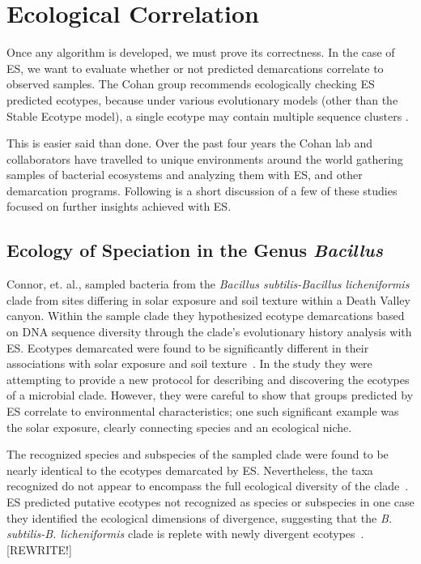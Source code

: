\section{Ecological Correlation}
Once any algorithm is developed, we must prove its correctness.
In the case of ES, we want to evaluate whether or not predicted demarcations correlate to observed samples.
The Cohan group recommends ecologically checking ES predicted ecotypes, because under various evolutionary models (other than the Stable Ecotype model), a single ecotype may contain multiple sequence clusters \cite{koeppel2008identifying, connor2010ecology}.

This is easier said than done.
Over the past four years the Cohan lab and collaborators have travelled to unique environments around the world gathering samples of bacterial ecosystems and analyzing them with ES, and other demarcation programs.
Following is a short discussion of a few of these studies focused on further insights achieved with ES.

\subsection*{Ecology of Speciation in the Genus \emph{Bacillus}}
Connor, et. al., sampled bacteria from the \emph{Bacillus subtilis-Bacillus licheniformis} clade from sites differing in solar exposure and soil texture within a Death Valley canyon.
Within the sample clade they hypothesized ecotype demarcations based on DNA sequence diversity through the clade's evolutionary history analysis with ES.
Ecotypes demarcated were found to be significantly different in their associations with solar exposure and soil texture~\cite{connor2010ecology}.
In the study they were attempting to provide a new protocol for describing and discovering the ecotypes of a microbial clade.
However, they were careful to show that groups predicted by ES correlate to environmental characteristics; one such significant example was the solar exposure, clearly connecting species and an ecological niche.

The recognized species and subspecies of the sampled clade were found to be nearly identical to the ecotypes demarcated by ES.
Nevertheless, the taxa recognized do not appear to encompass the full ecological diversity of the clade~\cite{connor2010ecology}.
ES predicted putative ecotypes not recognized as species or subspecies in one case they identified the ecological dimensions of divergence, suggesting that the \emph{B. subtilis-B. licheniformis} clade is replete with newly divergent ecotypes~\cite{connor2010ecology}. [REWRITE!]

